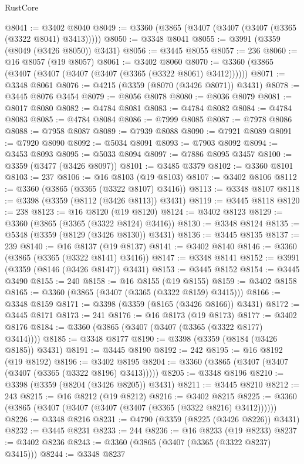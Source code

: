 \begin{lexlean}{RustCore}
\begin{coremodule}
@8041 := @3402 @8040
@8049 := @3360 (@3865 (@3407 (@3407 (@3407 (@3365 (@3322 @8041) @3413)))))
@8050 := @3348 @8041
@8055 := @3991 (@3359 (@8049 (@3426 @8050)) @3431)
@8056 := @3445 @8055
@8057 := 236
@8060 := @16 @8057 (@19 @8057)
@8061 := @3402 @8060
@8070 := @3360 (@3865 (@3407 (@3407 (@3407 (@3407 (@3365 (@3322 @8061) @3412))))))
@8071 := @3348 @8061
@8076 := @4215 (@3359 (@8070 (@3426 @8071)) @3431)
@8078 := @3445 @8076 @3454
@8079 := @8056 @8078
@8080 := @8036 @8079
@8081 := @8017 @8080
@8082 := @4784 @8081
@8083 := @4784 @8082
@8084 := @4784 @8083
@8085 := @4784 @8084
@8086 := @7999 @8085
@8087 := @7978 @8086
@8088 := @7958 @8087
@8089 := @7939 @8088
@8090 := @7921 @8089
@8091 := @7920 @8090
@8092 := @5034 @8091
@8093 := @7903 @8092
@8094 := @3453 @8093
@8095 := @5033 @8094
@8097 := @7886 @8095 @3457
@8100 := @3359 (@3477 (@3426 @8097))
@8101 := @3485 @3379
@8102 := @3360 @8101
@8103 := 237
@8106 := @16 @8103 (@19 @8103)
@8107 := @3402 @8106
@8112 := @3360 (@3865 (@3365 (@3322 @8107) @3416))
@8113 := @3348 @8107
@8118 := @3398 (@3359 (@8112 (@3426 @8113)) @3431)
@8119 := @3445 @8118
@8120 := 238
@8123 := @16 @8120 (@19 @8120)
@8124 := @3402 @8123
@8129 := @3360 (@3865 (@3365 (@3322 @8124) @3416))
@8130 := @3348 @8124
@8135 := @5348 (@3359 (@8129 (@3426 @8130)) @3431)
@8136 := @3445 @8135
@8137 := 239
@8140 := @16 @8137 (@19 @8137)
@8141 := @3402 @8140
@8146 := @3360 (@3865 (@3365 (@3322 @8141) @3416))
@8147 := @3348 @8141
@8152 := @3991 (@3359 (@8146 (@3426 @8147)) @3431)
@8153 := @3445 @8152
@8154 := @3445 @3490
@8155 := 240
@8158 := @16 @8155 (@19 @8155)
@8159 := @3402 @8158
@8165 := @3360 (@3865 (@3407 (@3365 (@3322 @8159) @3415)))
@8166 := @3348 @8159
@8171 := @3398 (@3359 (@8165 (@3426 @8166)) @3431)
@8172 := @3445 @8171
@8173 := 241
@8176 := @16 @8173 (@19 @8173)
@8177 := @3402 @8176
@8184 := @3360 (@3865 (@3407 (@3407 (@3365 (@3322 @8177) @3414))))
@8185 := @3348 @8177
@8190 := @3398 (@3359 (@8184 (@3426 @8185)) @3431)
@8191 := @3445 @8190
@8192 := 242
@8195 := @16 @8192 (@19 @8192)
@8196 := @3402 @8195
@8204 := @3360 (@3865 (@3407 (@3407 (@3407 (@3365 (@3322 @8196) @3413)))))
@8205 := @3348 @8196
@8210 := @3398 (@3359 (@8204 (@3426 @8205)) @3431)
@8211 := @3445 @8210
@8212 := 243
@8215 := @16 @8212 (@19 @8212)
@8216 := @3402 @8215
@8225 := @3360 (@3865 (@3407 (@3407 (@3407 (@3407 (@3365 (@3322 @8216) @3412))))))
@8226 := @3348 @8216
@8231 := @4790 (@3359 (@8225 (@3426 @8226)) @3431)
@8232 := @3445 @8231
@8233 := 244
@8236 := @16 @8233 (@19 @8233)
@8237 := @3402 @8236
@8243 := @3360 (@3865 (@3407 (@3365 (@3322 @8237) @3415)))
@8244 := @3348 @8237

\end{coremodule}
\end{lexlean}
